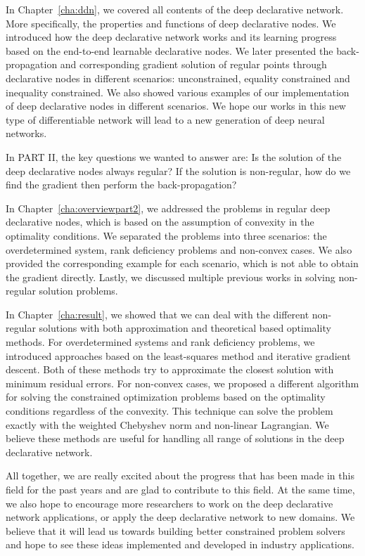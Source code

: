 \par In Chapter~\ref{cha:ddn}, we covered all contents of the deep declarative network. More specifically, the properties and functions of deep declarative nodes. We introduced how the deep declarative network works and its learning progress based on the end-to-end learnable declarative nodes. We later presented the back-propagation and corresponding gradient solution of regular points through declarative nodes in different scenarios: unconstrained, equality constrained and inequality constrained. We also showed various examples of our implementation of deep declarative nodes in different scenarios. We hope our works in this new type of differentiable network will lead to a new generation of deep neural networks.
\par In PART II, the key questions we wanted to answer are: Is the solution of the deep declarative nodes always regular? If the solution is non-regular, how do we find the gradient then perform the back-propagation? 
\par In Chapter~\ref{cha:overviewpart2}, we addressed the problems in regular deep declarative nodes, which is based on the assumption of convexity in the optimality conditions. We separated the problems into three scenarios: the overdetermined system, rank deficiency problems and non-convex cases. We also provided the corresponding example for each scenario, which is not able to obtain the gradient directly. Lastly, we discussed multiple previous works in solving non-regular solution problems. 
\par In Chapter~\ref{cha:result}, we showed that we can deal with the different non-regular solutions with both approximation and theoretical based optimality methods. For overdetermined systems and rank deficiency problems, we introduced approaches based on the least-squares method and iterative gradient descent. Both of these methods try to approximate the closest solution with minimum residual errors. For non-convex cases, we proposed a different algorithm for solving the constrained optimization problems based on the optimality conditions regardless of the convexity. This technique can solve the problem exactly with the weighted Chebyshev norm and non-linear Lagrangian. We believe these methods are useful for handling all range of solutions in the deep declarative network. 
\par All together, we are really excited about the progress that has been made in this field for the past years and are glad to contribute to this field. At the same time, we also hope to encourage more researchers to work on the deep declarative network applications, or apply the deep declarative network to new domains. We believe that it will lead us towards building better constrained problem solvers and hope to see these ideas implemented and developed in industry applications.